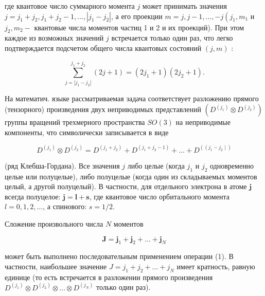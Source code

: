 \documentclass[10pt]{article}
\begin{document}
где квантовое число суммарного момента $j$ может принимать значения $j=j_{1}+j_{2}, j_{1}+j_{2}-1, \ldots,\left|j_{1}-j_{2}\right|$, а его проекции $m=j, j-1, \ldots,-j\left(j_{1}, m_{1}\right.$ и $j_{2}, m_{2}-$ квантовые числа моментов частиц 1 и 2 и их проекций). При этом каждое из возможных значений $j$ встречается только один раз, что легко подтверждается подсчетом общего числа квантовых состояний $(j, m)$ :



\[

\sum_{j=\left|j_{1}-j_{2}\right|}^{j_{1}+j_{2}}(2 j+1)=\left(2 j_{1}+1\right)\left(2 j_{2}+1\right) .

\]



На математич. языке рассматриваемая задача соответствует разложению прямого (тензорного) произведения двух неприводимых представлений $\left(D^{\left(j_{1}\right)} \otimes D^{\left(j_{2}\right)}\right)$ группы вращений трехмерного пространства $S O(3)$ на неприводимые компоненты, что символически записывается в виде



\[

D^{\left(j_{1}\right)} \otimes D^{\left(j_{2}\right)}=D^{\left(j_{1}+j_{2}\right)}+D^{\left(j_{1}+j_{2}-1\right)}+\ldots+D^{\left(\left(j_{1}-j_{2} \mid\right)\right.}

\]



(ряд Клебша-Гордана). Все значения $j$ либо целые (когда $j_{1}$ и $j_{2}$ одновременно целые или полуцелые), либо полуцелые (когда один из складываемых моментов целый, а другой полуцелый). В частности, для отдельного электрона в атоме $\boldsymbol{j}$ всегда полуцелое: $\boldsymbol{j}=\boldsymbol{l}+\boldsymbol{s}$, где квантовое число орбитального момента $l=0,1,2, \ldots$, а спинового: $s=1 / 2$.



Сложение произвольного числа $N$ моментов



\[

\boldsymbol{J}=\boldsymbol{j}_{1}+\boldsymbol{j}_{2}+\ldots+\boldsymbol{j}_{N}

\]



может быть выполнено последовательным применением операции (1). В частности, наибольшее значение $J=j_{1}+j_{2}+\ldots+j_{N}$ имеет кратность, равную единице (то есть встречается в разложении прямого произведения $D^{\left(j_{1}\right)} \otimes D^{\left(j_{2}\right)} \otimes \ldots \otimes D^{\left(j_{N}\right)}$ только один раз).
\end{document}
